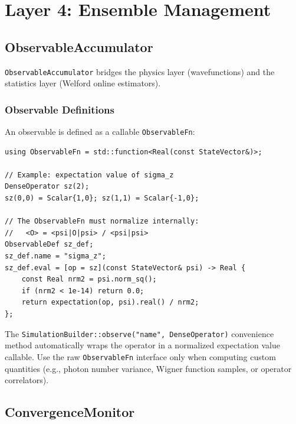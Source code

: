 \documentclass[11pt,a4paper,twoside]{book}
\newcommand{\code}[1]{\texttt{\small#1}}
\theoremstyle{definition}
\theoremstyle{remark}
\begin{document}
\chapter{Layer 4: Ensemble Management}
\label{chap:ensemble}

\section{ObservableAccumulator}
\label{sec:observable-accumulator}

\code{ObservableAccumulator} bridges the physics layer (wavefunctions)
and the statistics layer (Welford online estimators).

\subsection{Observable Definitions}
\label{subsec:observable-defs}

An observable is defined as a callable \code{ObservableFn}:

\begin{verbatim}
using ObservableFn = std::function<Real(const StateVector&)>;

// Example: expectation value of sigma_z
DenseOperator sz(2);
sz(0,0) = Scalar{1,0}; sz(1,1) = Scalar{-1,0};

// The ObservableFn must normalize internally:
//   <O> = <psi|O|psi> / <psi|psi>
ObservableDef sz_def;
sz_def.name = "sigma_z";
sz_def.eval = [op = sz](const StateVector& psi) -> Real {
    const Real nrm2 = psi.norm_sq();
    if (nrm2 < 1e-14) return 0.0;
    return expectation(op, psi).real() / nrm2;
};
\end{verbatim}

\begin{notebox}
  The \code{SimulationBuilder::observe("name", DenseOperator)} convenience
  method automatically wraps the operator in a normalized expectation
  value callable. Use the raw \code{ObservableFn} interface only when
  computing custom quantities (e.g., photon number variance,
  Wigner function samples, or operator correlators).
\end{notebox}

\section{ConvergenceMonitor}
\label{sec:convergence-monitor}
\end{document}
